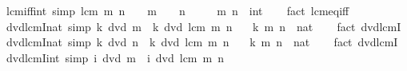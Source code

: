 \begin{isabellebody}
\endisatagproof
{\isafoldproof}%
%
\isadelimproof
\isanewline
%
\endisadelimproof
\isanewline
{}\isamarkupfalse%
\ lcm{\isacharunderscore}{\kern0pt}{}{\isacharunderscore}{\kern0pt}iff{\isacharunderscore}{\kern0pt}int\ {\isacharbrackleft}{\kern0pt}simp{\isacharbrackright}{\kern0pt}{\isacharcolon}{\kern0pt}\ {\isachardoublequoteopen}lcm\ m\ n\ {\isacharequal}{\kern0pt}\ {}\ {\isasymlongleftrightarrow}\ m\ {\isacharequal}{\kern0pt}\ {}\ {\isasymor}\ n\ {\isacharequal}{\kern0pt}\ {}{\isachardoublequoteclose}\isanewline
\ \ \ m\ n\ {\isacharcolon}{\kern0pt}{\isacharcolon}{\kern0pt}\ int\isanewline
%
\isadelimproof
\ \ %
\endisadelimproof
%
\isatagproof
{}\isamarkupfalse%
\ {\isacharparenleft}{\kern0pt}fact\ lcm{\isacharunderscore}{\kern0pt}eq{\isacharunderscore}{\kern0pt}{}{\isacharunderscore}{\kern0pt}iff{\isacharparenright}{\kern0pt}%
\endisatagproof
{\isafoldproof}%
%
\isadelimproof
\isanewline
%
\endisadelimproof
\isanewline
{}\isamarkupfalse%
\ dvd{\isacharunderscore}{\kern0pt}lcm{\isacharunderscore}{\kern0pt}I{}{\isacharunderscore}{\kern0pt}nat\ {\isacharbrackleft}{\kern0pt}simp{\isacharbrackright}{\kern0pt}{\isacharcolon}{\kern0pt}\ {\isachardoublequoteopen}k\ dvd\ m\ {\isasymLongrightarrow}\ k\ dvd\ lcm\ m\ n{\isachardoublequoteclose}\isanewline
\ \ \ k\ m\ n\ {\isacharcolon}{\kern0pt}{\isacharcolon}{\kern0pt}\ nat\isanewline
%
\isadelimproof
\ \ %
\endisadelimproof
%
\isatagproof
{}\isamarkupfalse%
\ {\isacharparenleft}{\kern0pt}fact\ dvd{\isacharunderscore}{\kern0pt}lcmI{}{\isacharparenright}{\kern0pt}%
\endisatagproof
{\isafoldproof}%
%
\isadelimproof
\isanewline
%
\endisadelimproof
\isanewline
{}\isamarkupfalse%
\ dvd{\isacharunderscore}{\kern0pt}lcm{\isacharunderscore}{\kern0pt}I{}{\isacharunderscore}{\kern0pt}nat\ {\isacharbrackleft}{\kern0pt}simp{\isacharbrackright}{\kern0pt}{\isacharcolon}{\kern0pt}\ {\isachardoublequoteopen}k\ dvd\ n\ {\isasymLongrightarrow}\ k\ dvd\ lcm\ m\ n{\isachardoublequoteclose}\isanewline
\ \ \ k\ m\ n\ {\isacharcolon}{\kern0pt}{\isacharcolon}{\kern0pt}\ nat\isanewline
%
\isadelimproof
\ \ %
\endisadelimproof
%
\isatagproof
{}\isamarkupfalse%
\ {\isacharparenleft}{\kern0pt}fact\ dvd{\isacharunderscore}{\kern0pt}lcmI{}{\isacharparenright}{\kern0pt}%
\endisatagproof
{\isafoldproof}%
%
\isadelimproof
\isanewline
%
\endisadelimproof
\isanewline
{}\isamarkupfalse%
\ dvd{\isacharunderscore}{\kern0pt}lcm{\isacharunderscore}{\kern0pt}I{}{\isacharunderscore}{\kern0pt}int\ {\isacharbrackleft}{\kern0pt}simp{\isacharbrackright}{\kern0pt}{\isacharcolon}{\kern0pt}\ {\isachardoublequoteopen}i\ dvd\ m\ {\isasymLongrightarrow}\ i\ dvd\ lcm\ m\ n{\isachardoublequoteclose}\isanewline

\end{isabellebody}
